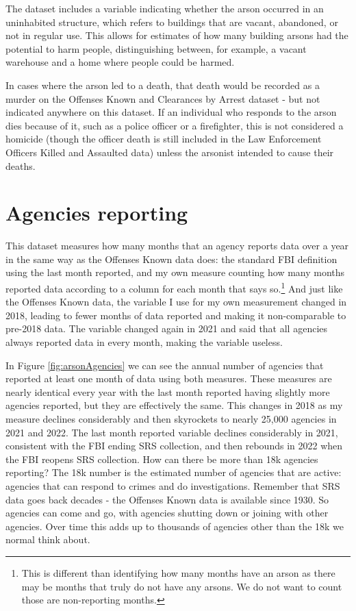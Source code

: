 \documentclass[
]{krantz}
\begin{document}
The dataset includes a variable indicating whether the arson
occurred in an uninhabited structure, which refers to
buildings that are vacant, abandoned, or not in regular use.
This allows for estimates of how many building arsons had
the potential to harm people, distinguishing between, for
example, a vacant warehouse and a home where people could be
harmed.

In cases where the arson led to a death, that death would be
recorded as a murder on the Offenses Known and Clearances by
Arrest dataset - but not indicated anywhere on this dataset.
If an individual who responds to the arson dies because of
it, such as a police officer or a firefighter, this is not
considered a homicide (though the officer death is still
included in the Law Enforcement Officers Killed and
Assaulted data) unless the arsonist intended to cause their
deaths.

\section{Agencies reporting}\label{agencies-reporting-4}

This dataset measures how many months that an agency reports
data over a year in the same way as the Offenses Known data
does: the standard FBI definition using the last month
reported, and my own measure counting how many months
reported data according to a column for each month that says
so.\footnote{This is different than identifying how many
  months have an arson as there may be months that truly do
  not have any arsons. We do not want to count those are
  non-reporting months.} And just like the Offenses Known
data, the variable I use for my own measurement changed in
2018, leading to fewer months of data reported and making it
non-comparable to pre-2018 data. The variable changed again
in 2021 and said that all agencies always reported data in
every month, making the variable useless.

In Figure \ref{fig:arsonAgencies} we can see the annual
number of agencies that reported at least one month of data
using both measures. These measures are nearly identical
every year with the last month reported having slightly more
agencies reported, but they are effectively the same. This
changes in 2018 as my measure declines considerably and then
skyrockets to nearly 25,000 agencies in 2021 and 2022. The
last month reported variable declines considerably in 2021,
consistent with the FBI ending SRS collection, and then
rebounds in 2022 when the FBI reopens SRS collection. How
can there be more than 18k agencies reporting? The 18k
number is the estimated number of agencies that are active:
agencies that can respond to crimes and do investigations.
Remember that SRS data goes back decades - the Offenses
Known data is available since 1930. So agencies can come and
go, with agencies shutting down or joining with other
agencies. Over time this adds up to thousands of agencies
other than the 18k we normal think about.
\end{document}
